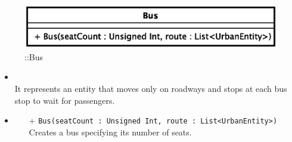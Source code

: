 \begin{figure}[h]
\centering
\includegraphics[scale=0.6,keepaspectratio]{images/solution/app/backend/bus.eps}
\caption{\pActive::Bus}
\label{fig:sd-app-bus}
\end{figure}
\FloatBarrier
\begin{itemize}
  \item \textbf{\descr} \\
It represents an entity that moves only on roadways and stops at each bus stop to
wait for passengers.
\item \textbf{\ops}
  \begin{itemize}
  \item[+] \texttt{Bus(seatCount : Unsigned Int, route : List<UrbanEntity>)} \\
Creates a bus specifying its number of seats.
  \end{itemize}
\end{itemize} 

